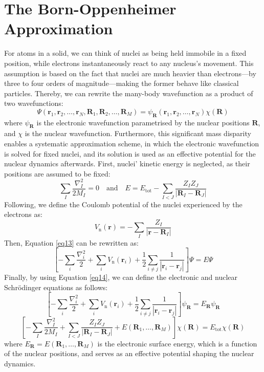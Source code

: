 \section{The Born-Oppenheimer Approximation}
For atoms in a solid, we can think of nuclei as being held immobile in a fixed position, while electrons instantaneously react to any nucleus's movement. This assumption is based on the fact that nuclei are much heavier than electrons---by three to four orders of magnitude---making the former behave like classical particles. Thereby, we can rewrite the many-body wavefunction as a product of two wavefunctions:
\begin{equation}
  \Psi(\mathbf{r}_1, \mathbf{r}_2, \ldots, \mathbf{r}_N, \mathbf{R}_1, \mathbf{R}_2, \ldots, \mathbf{R}_M) = \psi_{\mathbf{R}}(\mathbf{r}_1, \mathbf{r}_2, \ldots, \mathbf{r}_N)\chi(\mathbf{R})
  \label{eq14}
\end{equation}
where $\psi_{\mathbf{R}}$ is the electronic wavefunction parametrised by the nuclear positions $\mathbf{R}$, and $\chi$ is the nuclear wavefunction. Furthermore, this significant mass disparity enables a systematic approximation scheme, in which the electronic wavefunction is solved for fixed nuclei, and its solution is used as an effective potential for the nuclear dynamics afterwards. First, nuclei' kinetic energy is neglected, as their positions are assumed to be fixed: 
\begin{equation}
  \label{eq15}
  \sum_I \frac{\nabla_I^2}{2 M_I} = 0
  \quad \text{and} \quad  E = E_{\text{tot}} - \sum_{I<J} \frac{Z_I Z_J}{|\mathbf{R}_I - \mathbf{R}_J|}
\end{equation}
Following, we define the Coulomb potential of the nuclei experienced by the electrons as:
\begin{equation}
  \label{eq16}
  V_{\text{n}}(\mathbf{r}) = - \sum_{I} \frac{Z_I}{|\mathbf{r} - \mathbf{R}_I|}
\end{equation}
Then, Equation \ref{eq13} can be rewritten as:
\begin{equation}
  \label{eq17}
  \left[
    -\sum_i \frac{\nabla_i^2}{2} + \sum_i V_{\text{n}}(\mathbf{r}_i) + \frac{1}{2} \sum_{i\neq j} \frac{1}{|\mathbf{r}_i - \mathbf{r}_j|} 
  \right] \Psi = E \Psi 
\end{equation}
Finally, by using Equation \ref{eq14}, we can define the electronic and nuclear Schrödinger equations as follows:
\begin{equation}
  \label{eq18}
  \left[
    -\sum_i \frac{\nabla_i^2}{2} + \sum_i V_{\text{n}}(\mathbf{r}_i) + \frac{1}{2} \sum_{i\neq j} \frac{1}{|\mathbf{r}_i - \mathbf{r}_j|} 
  \right] \psi_{\mathbf{R}} = E_{\mathbf{R}} \psi_{\mathbf{R}}
\end{equation}
\begin{equation}
  \label{eq19}
  \left[
    -\sum_I \frac{\nabla_I^2}{2 M_I} + \sum_{I<J} \frac{Z_I Z_J}{|\mathbf{R}_I - \mathbf{R}_J|} + E(\mathbf{R}_1,\dots,\mathbf{R}_M)\right] \chi(\mathbf{R}) = E_{\text{tot}} \chi(\mathbf{R})
\end{equation}
where $E_{\mathbf{R}}= E(\mathbf{R}_1,\dots,\mathbf{R}_M)$ is the electronic surface energy, which is a function of the nuclear positions, and serves as an effective potential shaping the nuclear dynamics. 

